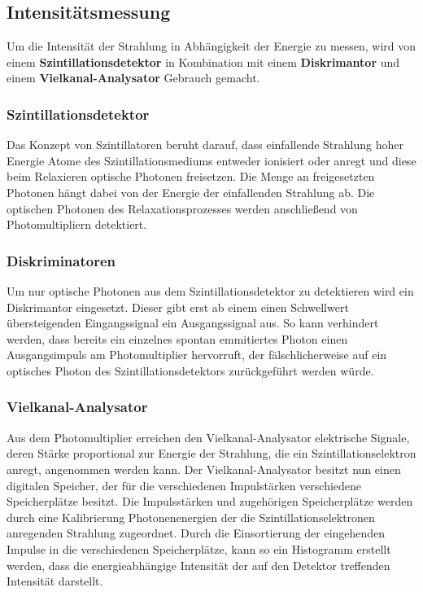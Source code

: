         \FloatBarrier

      \newpage
      \subsection{Intensitätsmessung}
        Um die Intensität der Strahlung in Abhängigkeit der Energie zu messen, wird von einem \textbf{Szintillationsdetektor} in Kombination mit einem \textbf{Diskrimantor} und einem 
        \textbf{Vielkanal-Analysator} Gebrauch gemacht.

        \subsubsection*{Szintillationsdetektor}
          Das Konzept von Szintillatoren beruht darauf, dass einfallende Strahlung hoher Energie Atome des Szintillationsmediums entweder ionisiert oder anregt und 
          diese beim Relaxieren optische Photonen freisetzen. Die Menge an freigesetzten Photonen hängt dabei von der Energie der einfallenden Strahlung ab. Die optischen Photonen des Relaxationsprozesses 
          werden anschließend von Photomultipliern detektiert. %

        \subsubsection*{Diskriminatoren}
          Um nur optische Photonen aus dem Szintillationsdetektor zu detektieren wird ein Diskrimantor eingesetzt. Dieser gibt erst ab einem einen Schwellwert übersteigenden Eingangssignal ein Ausgangssignal 
          aus. So kann verhindert werden, dass bereits ein einzelnes spontan emmitiertes Photon einen Ausgangsimpuls am Photomultiplier hervorruft, der fälschlicherweise auf ein optisches Photon des 
          Szintillationsdetektors zurückgeführt werden würde.

        \subsubsection*{Vielkanal-Analysator}
          Aus dem Photomultiplier erreichen den Vielkanal-Analysator elektrische Signale, deren Stärke proportional zur Energie der Strahlung, die ein Szintillationselektron anregt, angenommen werden kann. 
          Der Vielkanal-Analysator besitzt nun einen digitalen Speicher, der für die verschiedenen Impulstärken verschiedene Speicherplätze besitzt. Die Impulsstärken und zugehörigen Speicherplätze werden
          durch eine Kalibrierung Photonenenergien der die Szintillationselektronen anregenden Strahlung zugeordnet. Durch die Einsortierung der eingehenden Impulse in die verschiedenen Speicherplätze, kann so 
          ein Histogramm erstellt werden, dass die energieabhängige Intensität der auf den Detektor treffenden Intensität darstellt. 

           

